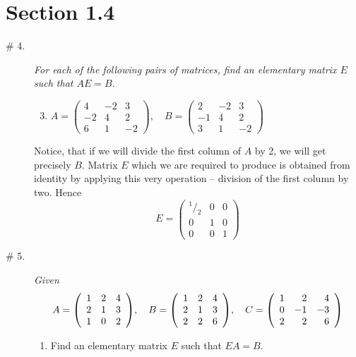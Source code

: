 \documentclass[8pt]{article} %
\begin{document}
	\section{Section 1.4}
	\begin{description}
	\item[\# 4.]{\textit{For each of the following pairs of matrices, find an elementary matrix $E$ such that $AE=B$.}
		\begin{enumerate}[label=(\alph*)]
			\setcounter{enumi}{2}
		\item $A=\left(\begin{array}{rrr}4&-2&3\\-2&4&2\\6&1&-2\end{array}\right),
				\quad B=\left(\begin{array}{rrr}2&-2&3\\-1&4&2\\3&1&-2\end{array}\right)$
		\end{enumerate}
		Notice, that if we will divide the first column of $A$ by 2, we will get precisely $B$. Matrix $E$ which we are required to produce
		is obtained from identity by applying this very operation -- division of the first column by two.
		Hence \[E=\left(\begin{array}{rrr}^1/_2&0&0\\0&1&0\\0&0&1\end{array}\right)\]
		}
	\item[\# 5.]{
		\newenvironment{mymat}{\left(\begin{array}{rrr}}{\end{array}\right)}
		{\it Given
		\[A=\begin{mymat}1&2&4\\2&1&3\\1&0&2\end{mymat},\quad B=\begin{mymat}1&2&4\\2&1&3\\2&2&6\end{mymat},\quad 
		C=\begin{mymat}1&2&4\\0&-1&-3\\2&2&6\end{mymat}\]
		\begin{enumerate}[label=(\alph*)]
			\item Find an elementary matrix $E$ such that $EA=B$.

\end{enumerate}}}
\end{description}
\end{document}
